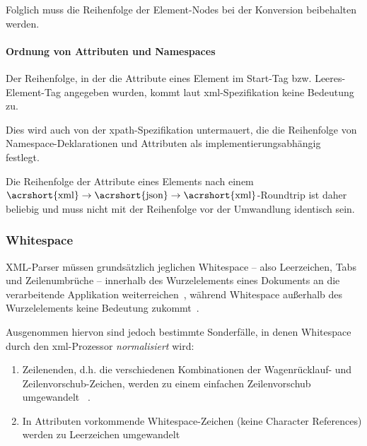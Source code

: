 Folglich muss die Reihenfolge der Element-Nodes bei der Konversion beibehalten werden.

\paragraph{Ordnung von Attributen und Namespaces}

Der Reihenfolge, in der die Attribute eines Element im Start-Tag bzw. Leeres-Element-Tag angegeben wurden, kommt laut \acrshort{xml}-Spezi\-fikation keine Bedeutung zu.~\cite[Abschnitt~3.1]{maler2008xml}

Dies wird auch von der \acrshort{xpath}-Spezifikation untermauert, die die Reihenfolge von Name\-space-Deklarationen und Attributen als implementierungsabhängig festlegt.~\cite[Abschnitt~5]{clark1999xpath1}

Die Reihenfolge der Attribute eines Elements nach einem $\text{\acrshort{xml}}\rightarrow{}\text{\acrshort{json}}\rightarrow{}\text{\acrshort{xml}}$-Roundtrip ist daher beliebig und muss nicht mit der Reihenfolge vor der Umwandlung identisch sein.

\subsubsection{Whitespace}

XML-Parser müssen grundsätzlich jeglichen Whitespace -- also Leerzeichen, Tabs und Zeilenumbrüche --  innerhalb des Wurzelelements eines Dokuments an die verarbeitende Applikation weiterreichen~\cite[Abschn.~2.10]{maler2008xml}, während Whitespace außerhalb des Wurzelelements keine Bedeutung zukommt~\cite[Abschnitt~2.1]{boyer2001c14n}.

\begin{samepage}
    Ausgenommen hiervon sind jedoch bestimmte Sonderfälle, in denen Whitespace durch den \acrshort{xml}-Prozessor \emph{normalisiert} wird:
    \begin{enumerate}
        \item{} Zeilenenden, d.h. die verschiedenen Kombinationen der Wagenrücklauf- und \linebreak{}Zeilenvorschub-Zeichen, werden zu einem einfachen Zeilenvorschub umgewandelt ~\cite[Abschn.~2.11]{maler2008xml}.
        \item{} In Attributen vorkommende Whitespace-Zeichen (keine Character References) werden zu Leerzeichen umgewandelt~\cite[Abschn.~3.3.3]{maler2008xml}
    \end{enumerate}
\end{samepage}

